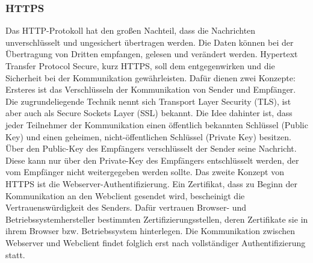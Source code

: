 \subsubsection{HTTPS}
Das HTTP-Protokoll hat den großen Nachteil, dass die Nachrichten unverschlüsselt und ungesichert übertragen werden. 
Die Daten können bei der Übertragung von Dritten empfangen, gelesen und verändert werden. Hypertext Transfer Protocol Secure, kurz HTTPS, soll dem entgegenwirken und die Sicherheit bei der Kommunikation gewährleisten. 
Dafür dienen zwei Konzepte:
\newline
\noindent
Ersteres ist das Verschlüsseln der Kommunikation von Sender und Empfänger. Die zugrundeliegende Technik nennt sich Transport Layer Security (TLS), ist aber auch als Secure Sockets Layer (SSL) bekannt. Die Idee dahinter ist, dass jeder Teilnehmer der Kommunikation einen öffentlich bekannten Schlüssel (Public Key) und einen geheimen, nicht-öffentlichen Schlüssel (Private Key) besitzen. Über den Public-Key des Empfängers verschlüsselt der Sender seine Nachricht. Diese kann nur über den Private-Key des Empfängers entschlüsselt werden, der vom Empfänger nicht weitergegeben werden sollte.
\newline
\noindent
Das zweite Konzept von HTTPS ist die Webserver-Authentifizierung. Ein Zertifikat, dass zu Beginn der Kommunikation an den Webclient gesendet wird, bescheinigt die Vertrauenswürdigkeit des Senders. Dafür vertrauen Browser- und Betriebssystemhersteller bestimmten Zertifizierungsstellen, deren Zertifikate sie in ihrem Browser bzw. Betriebssystem hinterlegen. Die Kommunikation zwischen Webserver und Webclient findet folglich erst nach vollständiger Authentifizierung statt.
